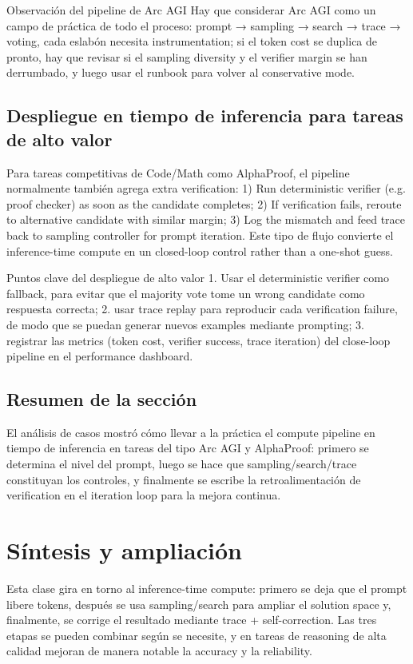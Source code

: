 \documentclass[a4paper]{article}
\begin{document}
\begin{importantbox}{Observación del pipeline de Arc AGI}
Hay que considerar Arc AGI como un campo de práctica de todo el proceso: prompt → sampling → search → trace → voting, cada eslabón necesita instrumentation; si el token cost se duplica de pronto, hay que revisar si el sampling diversity y el verifier margin se han derrumbado, y luego usar el runbook para volver al conservative mode.
\end{importantbox}

\subsection{Despliegue en tiempo de inferencia para tareas de alto valor}
Para tareas competitivas de Code/Math como AlphaProof, el pipeline normalmente también agrega extra verification: 1) Run deterministic verifier (e.g. proof checker) as soon as the candidate completes; 2) If verification fails, reroute to alternative candidate with similar margin; 3) Log the mismatch and feed trace back to sampling controller for prompt iteration. Este tipo de flujo convierte el inference-time compute en un closed-loop control rather than a one-shot guess.

\begin{knowledgebox}{Puntos clave del despliegue de alto valor}
1. Usar el deterministic verifier como fallback, para evitar que el majority vote tome un wrong candidate como respuesta correcta; 2. usar trace replay para reproducir cada verification failure, de modo que se puedan generar nuevos examples mediante prompting; 3. registrar las metrics (token cost, verifier success, trace iteration) del close-loop pipeline en el performance dashboard.
\end{knowledgebox}

\subsection{Resumen de la sección}
El análisis de casos mostró cómo llevar a la práctica el compute pipeline en tiempo de inferencia en tareas del tipo Arc AGI y AlphaProof: primero se determina el nivel del prompt, luego se hace que sampling/search/trace constituyan los controles, y finalmente se escribe la retroalimentación de verification en el iteration loop para la mejora continua.

\section{Síntesis y ampliación}
Esta clase gira en torno al inference-time compute: primero se deja que el prompt libere tokens, después se usa sampling/search para ampliar el solution space y, finalmente, se corrige el resultado mediante trace + self-correction. Las tres etapas se pueden combinar según se necesite, y en tareas de reasoning de alta calidad mejoran de manera notable la accuracy y la reliability.
\end{document}
